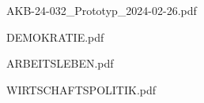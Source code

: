 


{AKB-24-032_Prototyp_2024-02-26.pdf}



{DEMOKRATIE.pdf}



{ARBEITSLEBEN.pdf}



{WIRTSCHAFTSPOLITIK.pdf}


